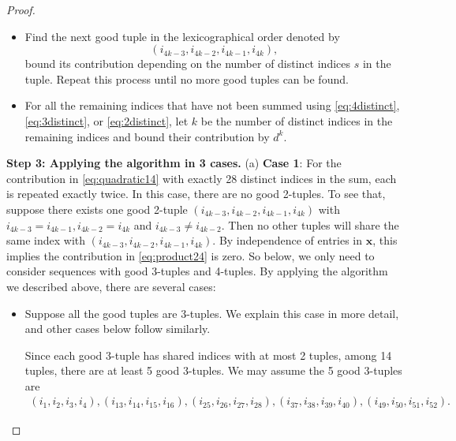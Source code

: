 \documentclass[twoside,11pt]{article}
\def\bx{{\boldsymbol x}}
\newcommand{\1}{\mathbf{1}}
\begin{document}
\begin{proof}
\begin{itemize}
 
    \item Find the next good tuple in the lexicographical order denoted by  $$(i_{4k-3},i_{4k-2},i_{4k-1},i_{4k}),$$ bound its contribution depending on the number of distinct indices $s$ in the tuple.  Repeat this process until no more good tuples can be found. 
\item For all the remaining indices that have not been summed using \eqref{eq:4distinct}, \eqref{eq:3distinct}, or \eqref{eq:2distinct}, let $k$ be 
the number of distinct indices in the remaining indices and bound their contribution by $d^{k}$.
\end{itemize}






 
\textbf{Step 3: Applying the algorithm in 3 cases.}
(a) \textbf{Case 1}: For the contribution in \eqref{eq:quadratic14} with exactly 28 distinct indices in the sum, each is repeated exactly twice.
In this case, there are no good 2-tuples. To see that, suppose there exists one good 2-tuple $(i_{4k-3},i_{4k-2},i_{4k-1},i_{4k})$ with $i_{4k-3}=i_{4k-1}, i_{4k-2}=i_{4k}$ and $i_{4k-3}\not=i_{4k-2}$. Then no other tuples will share the same index with $(i_{4k-3},i_{4k-2},i_{4k-1},i_{4k})$. By independence of entries in $\bx$, this implies the contribution in \eqref{eq:product24} is zero. So below, we only need to consider sequences with good 3-tuples and 4-tuples.  By applying the algorithm we described above, there are several cases:
\begin{itemize}
    \item Suppose all the good tuples are 3-tuples. We explain this case in more detail, and other cases below follow similarly. 
    
    Since each good 3-tuple has shared indices with at most 2 tuples, among 14 tuples, there are at least 5 good 3-tuples. We may assume the 5 good 3-tuples are 
    \begin{align}\label{eq:5good}
        (i_1,i_2,i_3,i_4), (i_{13},i_{14},i_{15},i_{16}), (i_{25},i_{26},i_{27}, i_{28}), (i_{37}, i_{38}, i_{39},i_{40}), (i_{49},i_{50}, i_{51}, i_{52}).
    \end{align}

    

\begin{figure}
\centering
\end{figure}
\end{itemize}
\end{proof}
\end{document}
